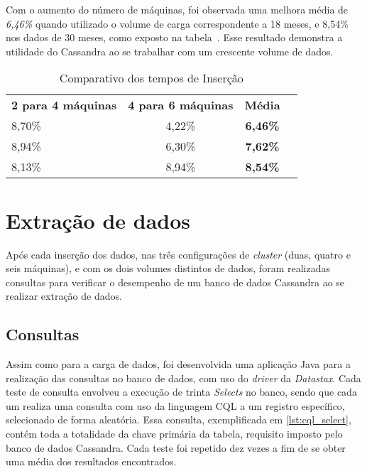 Com o aumento do número de máquinas, foi observada uma melhora média de \emph{6,46\%} quando utilizado o volume de carga correspondente a 18 meses, e {8,54\%} nos dados de 30 meses, como exposto na tabela~\cite{tb:comparativo_insert}. Esse resultado demonstra a utilidade do Cassandra ao se trabalhar com um crescente volume de dados.

\begin{table}[]
	\centering
	\caption{Comparativo dos tempos de Inserção}
	\label{tb:comparativo_insert}
	\begin{tabular}{|l|c|c|l}
		\cline{1-3}
		\textbf{2 para 4 máquinas} & \textbf{4 para 6 máquinas} & \textbf{Média}  &  \\ \cline{1-3}
		8,70\%                     & 4,22\%                     & \textbf{6,46\%} &  \\ \cline{1-3}
		8,94\%                     & 6,30\%                     & \textbf{7,62\%} &  \\ \cline{1-3}
		8,13\%                     & 8,94\%                     & \textbf{8,54\%} &  \\ \cline{1-3}
	\end{tabular}
\end{table}


\section{Extração de dados}
Após cada inserção dos dados, nas três configurações de \emph{cluster} (duas, quatro e seis máquinas), e com os dois volumes distintos de dados, foram realizadas consultas para verificar o desempenho de um banco de dados Cassandra ao se realizar extração de dados.

\subsection{Consultas}
Assim como para a carga de dados, foi desenvolvida uma aplicação Java para a realização das consultas no banco de dados, com uso do \emph{driver} da \emph{Datastax}. Cada teste de consulta envolveu a execução de trinta \emph{Selects} no banco, sendo que cada um realiza uma consulta com uso da linguagem CQL a um registro específico, selecionado de forma aleatória. Essa consulta, exemplificada em \ref{lst:cql_select}, contém toda a totalidade da chave primária da tabela, requisito imposto pelo banco de dados Cassandra. Cada teste foi repetido dez vezes a fim de se obter uma média dos resultados encontrados.

